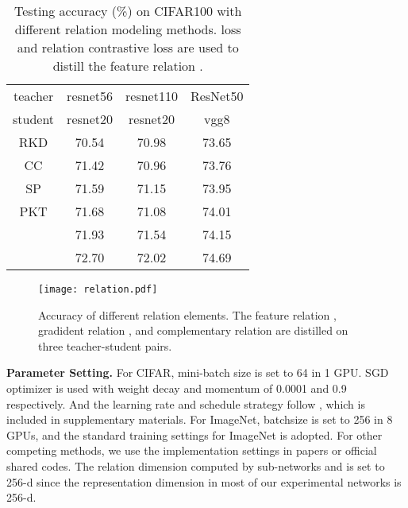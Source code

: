 \documentclass[final]{cvpr}
\begin{document}
\begin{table}[t]
\small
    \centering
     \caption{Testing accuracy (\%) on CIFAR100 with different relation modeling methods. 
      loss and relation contrastive loss  are used to distill the feature relation .
} 
\begin{tabular}{c|cc|c}
\toprule
teacher   & resnet56 &resnet110 &  ResNet50 \\
student & resnet20 & resnet20 & vgg8\\


\midrule

 RKD \cite{park2019relational} & 70.54 & 70.98 & 73.65  \\
  CC \cite{peng2019correlation}  & 71.42 & 70.96 & 73.76 \\
  SP \cite{tung2019similarity} & 71.59 & 71.15 & 73.95 \\
 PKT \cite{pkt}  & 71.68 & 71.08 & 74.01  \\
 &  71.93 & 71.54 & 74.15 \\
 &  72.70 &72.02 & 74.69 \\
\bottomrule
\end{tabular}
    \label{tab:relationvalidate}
    \vspace{-0.2em}
\end{table}

\begin{figure}
    \centering
    \texttt{[image: relation.pdf]}
    \caption{Accuracy of different relation elements.  The feature relation , gradident relation , and complementary relation   are distilled on three teacher-student pairs.}
    \label{fig:relation_complementary}
\end{figure}


\noindent \textbf{Parameter Setting.} 
For CIFAR, mini-batch size is set to 64 in 1 GPU.
 SGD optimizer is used  with weight decay and momentum of 0.0001 and 0.9 respectively.
And the learning rate  and schedule strategy  follow \cite{crd}, which is included in supplementary materials.
For ImageNet, batchsize is set to 256 in 8 GPUs, and the standard training settings for ImageNet is adopted.
For other competing methods, we use the implementation settings in papers or official shared codes.
The relation dimension computed by sub-networks  and  is set to 256-d since the representation dimension in most of our experimental networks is 256-d.
\end{document}
